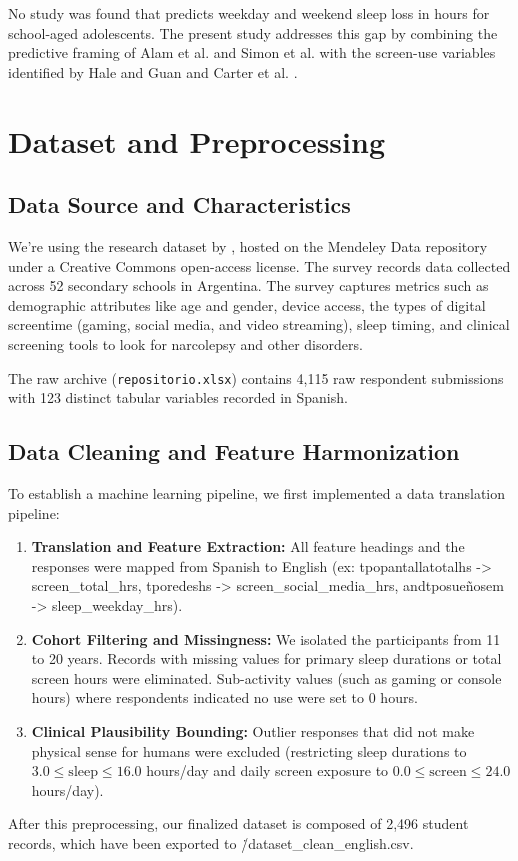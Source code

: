 \documentclass[11pt]{article}
\begin{document}
No study was found that predicts weekday and weekend sleep loss in hours for school-aged adolescents. The present study addresses this gap by combining the predictive framing of Alam et al. \citet{alam2023} and Simon et al. \citet{simon2024} with the screen-use variables identified by Hale and Guan \citet{hale2015} and Carter et al. \citet{carter2016}.
\section{Dataset and Preprocessing}
\label{sec:dataset}

\subsection{Data Source and Characteristics}
We're using the research dataset by \citet{perez2022screen}, hosted on the Mendeley Data repository under a Creative Commons open-access license. The survey records data collected across 52 secondary schools in Argentina. The survey captures metrics such as demographic attributes like age and gender, device access, the types of digital screentime (gaming, social media, and video streaming), sleep timing, and clinical screening tools to look for narcolepsy and other disorders.

The raw archive (\texttt{repositorio.xlsx}) contains 4,115 raw respondent submissions with 123 distinct tabular variables recorded in Spanish.

\subsection{Data Cleaning and Feature Harmonization}
To establish a machine learning pipeline, we first implemented a data translation pipeline:
\begin{enumerate}
    \item \textbf{Translation and Feature Extraction:} All feature headings and the responses were mapped from Spanish to English (ex: tpopantallatotalhs -> screen\_total\_hrs, tporedeshs -> screen\_social\_media\_hrs, andtposueñosem -> sleep\_weekday\_hrs).
    \item \textbf{Cohort Filtering and Missingness:} We isolated the participants from 11 to 20 years. Records with missing values for primary sleep durations or total screen hours were eliminated. Sub-activity values (such as gaming or console hours) where respondents indicated no use were set to 0 hours.
    \item \textbf{Clinical Plausibility Bounding:} Outlier responses that did not make physical sense for humans were excluded (restricting sleep durations to $3.0 \le \text{sleep} \le 16.0$ hours/day and daily screen exposure to $0.0 \le \text{screen} \le 24.0$ hours/day).
\end{enumerate}
After this preprocessing, our finalized dataset is composed of 2,496 student records, which have been exported to \./dataset\_clean\_english.csv.
\end{document}
